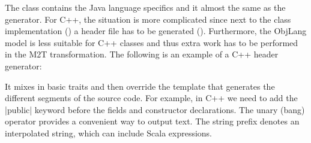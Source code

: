 The class \href{https://github.com/fikovnik/ttc14-fixml-sigma/blob/master/ttc14-fixml-base/src/fr/inria/spirals/sigma/ttc14/fixml/ObjLang2Java.scala}{} contains the Java language specifics and it almost the same as the \Csharp \href{https://github.com/fikovnik/ttc14-fixml-sigma/blob/master/ttc14-fixml-base/src/fr/inria/spirals/sigma/ttc14/fixml/ObjLang2CSharp.scala}{} generator.
For C++, the situation is more complicated since next to the class implementation (\href{https://github.com/fikovnik/ttc14-fixml-sigma/blob/master/ttc14-fixml-base/src/fr/inria/spirals/sigma/ttc14/fixml/ObjLang2CPPClassImpl.scala}{}) a header file has to be generated (\href{https://github.com/fikovnik/ttc14-fixml-sigma/blob/master/ttc14-fixml-base/src/fr/inria/spirals/sigma/ttc14/fixml/ObjLang2CPPClassHeader.scala}{}).
Furthermore, the ObjLang model is less suitable for C++ classes and thus extra work has to be performed in the M2T transformation.
%
The following is an example of a C++ header generator:
%
%
It mixes in basic traits and then override the template that generates the different segments of the source code.
For example, in C++ we need to add the \Scala|public| keyword before the fields and constructor declarations.
The unary \Scala{!} (bang) operator provides a convenient way to output text.
The  string prefix denotes an interpolated string, which can include Scala expressions.
